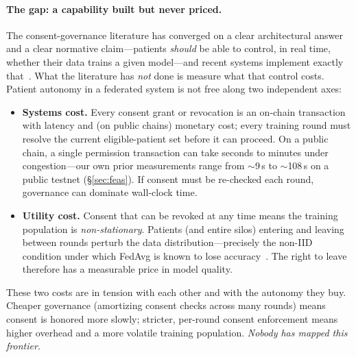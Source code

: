 \documentclass[11pt]{article}
\begin{document}
\paragraph{The gap: a capability built but never priced.}
The consent-governance literature has converged on a clear architectural answer
and a clear normative claim---patients \emph{should} be able to control, in real
time, whether their data trains a given model---and recent systems implement
exactly that~\cite{oxford2025,mdpi2025}. What the literature has \emph{not} done
is measure what that control costs. Patient autonomy in a federated system is not
free along two independent axes:
\begin{itemize}
\item \textbf{Systems cost.} Every consent grant or revocation is an on-chain
transaction with latency and (on public chains) monetary cost; every training
round must resolve the current eligible-patient set before it can proceed. On a
public chain, a single permission transaction can take seconds to minutes under
congestion---our own prior measurements range from $\sim$9\,s to $\sim$108\,s on
a public testnet (\S\ref{sec:feas}). If consent must be re-checked each round,
governance can dominate wall-clock time.
\item \textbf{Utility cost.} Consent that can be revoked at any time means the
training population is \emph{non-stationary}. Patients (and entire silos) entering
and leaving between rounds perturb the data distribution---precisely the non-IID
condition under which FedAvg is known to lose accuracy~\cite{zhao,fedprox}. The
right to leave therefore has a measurable price in model quality.
\end{itemize}
These two costs are in tension with each other and with the autonomy they buy.
Cheaper governance (amortizing consent checks across many rounds) means consent
is honored more slowly; stricter, per-round consent enforcement means higher
overhead and a more volatile training population. \emph{Nobody has mapped this
frontier.}
\end{document}
